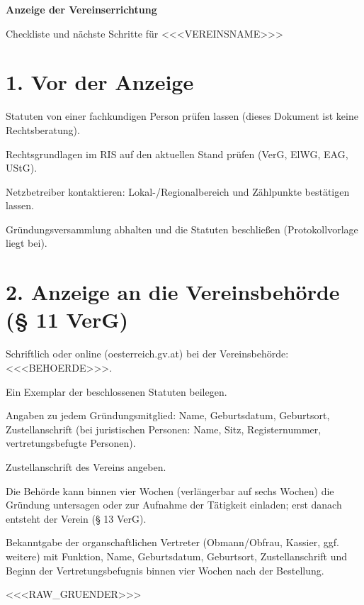 \documentclass[a4paper,10pt]{article}
\begin{document}
{\LARGE\bfseries\color{navy}Anzeige der Vereinserrichtung}\par
\vspace{1mm}
{\large\color{navy}Checkliste und nächste Schritte für \glqq{}<<<VEREINSNAME>>>\grqq{}}\par
\vspace{4mm}


\section*{1. Vor der Anzeige}
\begin{checkliste}
  \item Statuten von einer fachkundigen Person prüfen lassen (dieses Dokument ist keine Rechtsberatung).
  \item Rechtsgrundlagen im RIS auf den aktuellen Stand prüfen (VerG, ElWG, EAG, UStG).
  \item Netzbetreiber kontaktieren: Lokal-/Regionalbereich und Zählpunkte bestätigen lassen.
  \item Gründungsversammlung abhalten und die Statuten beschließen (Protokollvorlage liegt bei).
\end{checkliste}

\section*{2. Anzeige an die Vereinsbehörde (§ 11 VerG)}
\begin{checkliste}
  \item Schriftlich oder online (oesterreich.gv.at) bei der Vereinsbehörde: <<<BEHOERDE>>>.
  \item Ein Exemplar der beschlossenen Statuten beilegen.
  \item Angaben zu jedem Gründungsmitglied: Name, Geburtsdatum, Geburtsort, Zustellanschrift
        (bei juristischen Personen: Name, Sitz, Registernummer, vertretungsbefugte Personen).
  \item Zustellanschrift des Vereins angeben.
  \item Die Behörde kann binnen vier Wochen (verlängerbar auf sechs Wochen) die Gründung untersagen oder zur
        Aufnahme der Tätigkeit einladen; erst danach entsteht der Verein (§ 13 VerG).
  \item Bekanntgabe der organschaftlichen Vertreter (Obmann/Obfrau, Kassier, ggf. weitere) mit Funktion, Name,
        Geburtsdatum, Geburtsort, Zustellanschrift und Beginn der Vertretungsbefugnis binnen vier Wochen nach der
        Bestellung.
\end{checkliste}
<<<RAW_GRUENDER>>>
\end{document}

